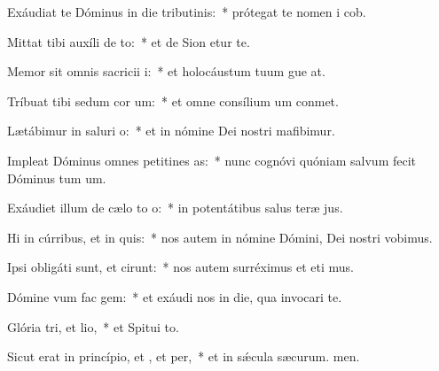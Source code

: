 \item Exáudiat te Dóminus in die tributinis:~* prótegat te nomen i cob.
\item Mittat tibi auxíli de to:~* et de Sion etur te.
\item Memor sit omnis sacricii i:~* et holocáustum tuum gue at.
\item Tríbuat tibi sedum cor um:~* et omne consílium um conmet.
\item Lætábimur in saluri o:~* et in nómine Dei nostri mafibimur.
\item Impleat Dóminus omnes petitines as:~* nunc cognóvi quóniam salvum fecit Dóminus tum um.
\item Exáudiet illum de cælo to o:~* in potentátibus salus teræ jus.
\item Hi in cúrribus, et  in quis:~* nos autem in nómine Dómini, Dei nostri vobimus.
\item Ipsi obligáti sunt, et cirunt:~* nos autem surréximus et eti mus.
\item Dómine vum fac gem:~* et exáudi nos in die, qua invocari te.
\item Glória tri, et lio,~* et Spitui to.
\item Sicut erat in princípio, et , et per,~* et in sǽcula sæcurum. men.
